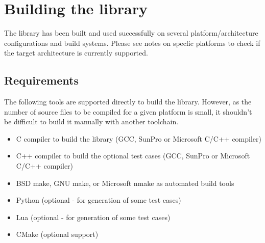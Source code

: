 %
%
%
%

\newpage
\section{Building the library}

The library has been built and used successfully on several 
platform/architecture configurations and build systems.
Please see notes on specfic platforms to check if the target
architecture is currently supported.


\subsection{Requirements}

The following tools are supported directly to build the  library.
However, as the number of source files to be compiled for a given
platform is small, it shouldn't be difficult to build it manually with
another toolchain.
\begin{itemize}
\item C compiler to build the  library (GCC, SunPro or Microsoft C/C++ compiler)
\item C++ compiler to build the optional test cases (GCC, SunPro or Microsoft C/C++ compiler)
\item BSD make, GNU make, or Microsoft nmake as automated build tools
\item Python (optional - for generation of some test cases)
\item Lua (optional - for generation of some test cases)
\item CMake (optional support)
\end{itemize}


